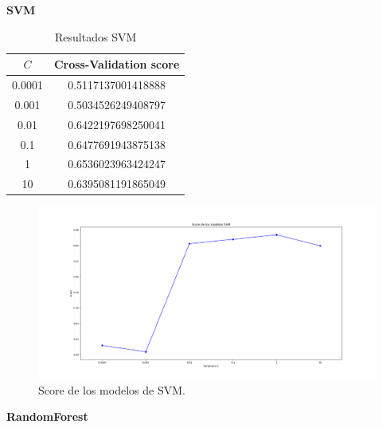 \documentclass[size=a4, parskip=half, titlepage=false, toc=flat, toc=bib, 12pt]{scrartcl}
\begin{document}
\textbf{SVM}

\begin{table}[ht]
    \centering
    \caption{Resultados SVM}
    \label{tab:results-plapocket}
    \begin{tabular}{c | c  }
 \(C\) & Cross-Validation score \\
 \hline
 0.0001 & 0.5117137001418888  \\
 0.001  & 0.5034526249408797  \\
 0.01   & 0.6422197698250041  \\
 0.1    & 0.6477691943875138 \\
 1      & 0.6536023963424247 \\
 10     & 0.6395081191865049
    \end{tabular}
\end{table}

\begin{figure}[H]
\centering
\includegraphics[width=1\textwidth]{./img/Figure_2}
\caption{Score de los modelos de SVM.}
\end{figure}

\textbf{RandomForest}
\end{document}

